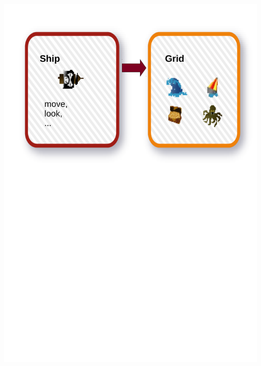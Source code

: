 \begin{frame}
	\begin{center}
		\includegraphics[scale=0.5]{simulation/Simulation6.pdf}
	\end{center}
\end{frame}

